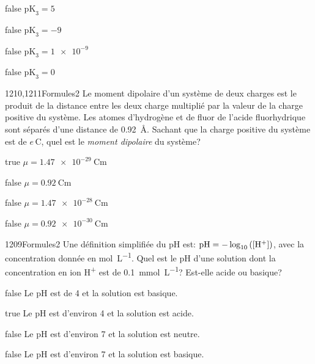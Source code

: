         \begin{reponses}
    	    \item[false] $\text{pK}_3 = 5$    
    	    \item[false] $\text{pK}_3 = -9$
    	    \item[false] $\text{pK}_3 = \num{1e-9}$
    	    \item[false] $\text{pK}_3 = 0$
        \end{reponses}
        \begin{question}{1210,1211}{Formules}{2}{}
			Le moment dipolaire d'un système de deux charges est le produit de la distance entre les deux charge multiplié par la valeur de la charge positive du système. Les atomes d'hydrogène et de fluor de l'acide fluorhydrique sont séparés d'une distance de \SI{0.92}{\angstrom}. Sachant que la charge positive du système est de $e\,\si{\coulomb}$, quel est le \emph{moment dipolaire} du système?
        \end{question}
        \begin{reponses}
    	    \item[true] $\mu = \SI{1.47e-29}{\coulomb\meter}$
    	    \item[false] $\mu = \SI{0.92}{\coulomb\meter}$
    	    \item[false] $\mu = \SI{1.47e-28}{\coulomb\meter}$
    	    \item[false] $\mu = \SI{0.92e-30}{\coulomb\meter}$
        \end{reponses}
		\begin{question}{1209}{Formules}{2}{}
			Une définition simplifiée du pH est: $\text{pH} = -\log_{10}\left(\text{[H\textsuperscript{+}]}\right)$, avec la concentration donnée en \si{\mol\per\liter}. Quel est le pH d'une solution dont la concentration en ion H\textsuperscript{+} est de \SI{0.1}{\milli\mol\per\liter}? Est-elle acide ou basique?
        \end{question}
        \begin{reponses}
    	    \item[false] Le pH est de \num{4} et la solution est basique.
    	    \item[true] Le pH est d'environ \num{4} et la solution est acide.
    	    \item[false] Le pH est d'environ \num{7} et la solution est neutre.
    	    \item[false] Le pH est d'environ \num{7} et la solution est basique.
        \end{reponses}
